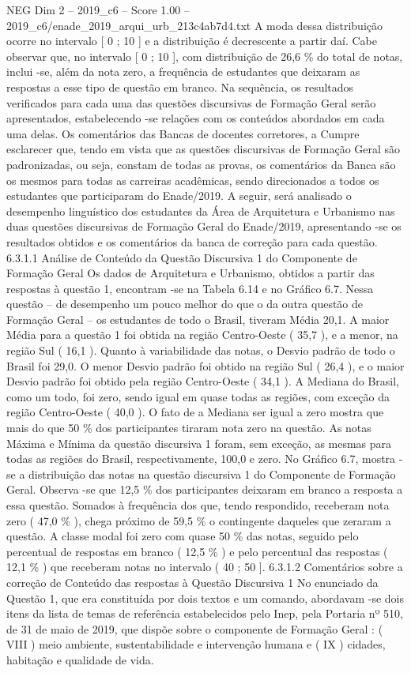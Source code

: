 \begin{textsample}{NEG Dim 2 – 2019\_c6 – Score 1.00 – 2019\_c6/enade\_2019\_arqui\_urb\_213c4ab7d4.txt}
A moda dessa distribuição ocorre no intervalo [ 0 ; 10 ] e a distribuição é decrescente a partir daí.
Cabe observar que, no intervalo [ 0 ; 10 ], com distribuição de 26,6 \% do total de notas, inclui -se, além da nota zero, a frequência de estudantes que deixaram as respostas a esse tipo de questão em branco.
Na sequência, os resultados verificados para cada uma das questões discursivas de Formação Geral serão apresentados, estabelecendo -se relações com os conteúdos abordados em cada uma delas.
Os comentários das Bancas de docentes corretores, a Cumpre esclarecer que, tendo em vista que as questões discursivas de Formação Geral são padronizadas, ou seja, constam de todas as provas, os comentários da Banca são os mesmos para todas as carreiras acadêmicas, sendo direcionados a todos os estudantes que participaram do Enade/2019.
A seguir, será analisado o desempenho linguístico dos estudantes da Área de Arquitetura e Urbanismo nas duas questões discursivas de Formação Geral do Enade/2019, apresentando -se os resultados obtidos e os comentários da banca de correção para cada questão. 6.3.1.1 Análise de Conteúdo da Questão Discursiva 1 do Componente de Formação Geral Os dados de Arquitetura e Urbanismo, obtidos a partir das respostas à questão 1, encontram -se na Tabela 6.14 e no Gráfico 6.7.
Nessa questão – de desempenho um pouco melhor do que o da outra questão de Formação Geral – os estudantes de todo o Brasil, tiveram Média 20,1.
A maior Média para a questão 1 foi obtida na região Centro-Oeste ( 35,7 ), e a menor, na região Sul ( 16,1 ).
Quanto à variabilidade das notas, o Desvio padrão de todo o Brasil foi 29,0.
O menor Desvio padrão foi obtido na região Sul ( 26,4 ), e o maior Desvio padrão foi obtido pela região Centro-Oeste ( 34,1 ).
A Mediana do Brasil, como um todo, foi zero, sendo igual em quase todas as regiões, com exceção da região Centro-Oeste ( 40,0 ).
O fato de a Mediana ser igual a zero mostra que mais do que 50 \% dos participantes tiraram nota zero na questão.
As notas Máxima e Mínima da questão discursiva 1 foram, sem exceção, as mesmas para todas as regiões do Brasil, respectivamente, 100,0 e zero.
No Gráfico 6.7, mostra -se a distribuição das notas na questão discursiva 1 do Componente de Formação Geral.
Observa -se que 12,5 \% dos participantes deixaram em branco a resposta a essa questão.
Somados à frequência dos que, tendo respondido, receberam nota zero ( 47,0 \% ), chega próximo de 59,5 \% o contingente daqueles que zeraram a questão.
A classe modal foi zero com quase 50 \% das notas, seguido pelo percentual de respostas em branco ( 12,5 \% ) e pelo percentual das respostas ( 12,1 \% ) que receberam notas no intervalo ( 40 ; 50 ]. 6.3.1.2 Comentários sobre a correção de Conteúdo das respostas à Questão Discursiva 1 No enunciado da Questão 1, que era constituída por dois textos e um comando, abordavam -se dois itens da lista de temas de referência estabelecidos pelo Inep, pela Portaria nº 510, de 31 de maio de 2019, que dispõe sobre o componente de Formação Geral : ( VIII ) meio ambiente, sustentabilidade e intervenção humana e ( IX ) cidades, habitação e qualidade de vida.

\end{textsample}
